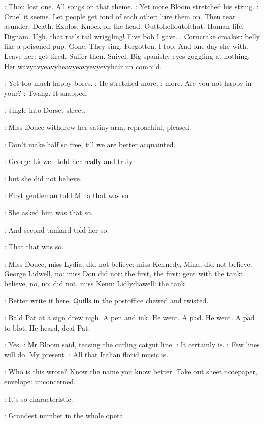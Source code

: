 \BloomInt:
Thou lost one. All songs on that theme.
:
Yet more Bloom stretched his string.
\BloomInt:
Cruel it seems. Let people get fond of each other: lure them on.
Then tear asunder. Death. Explos. Knock on the head. Outtohelloutofthat.
Human life. Dignam. Ugh, that rat's tail wriggling! Five bob I gave.
.
Corncrake croaker: belly like a poisoned pup. Gone.
They sing. Forgotten. I too; And one day she with. Leave her: get tired.
Suffer then. Snivel. Big spanishy eyes goggling at nothing. Her
wavyavyeavyheavyeavyevyevyhair un comb:'d.

\BloomInt:
Yet too much happy bores.
:
He stretched more,
\BloomInt:
more. Are you not happy in your?
:
Twang. It snapped.

:
Jingle into Dorset street.

:
Miss Douce withdrew her satiny arm, reproachful, pleased.

\MissD:
Don't make half so free, till we are better acquainted.

:
George Lidwell told her really and truly:

:
but she did not believe.

:
First gentleman told Mina that was so.

:
She asked him was that so.

:
And second tankard told her so.

:
That that was so.

:
Miss Douce, miss Lydia, did not believe: miss Kennedy, Mina, did not
believe: George Lidwell, no: miss Dou did not: the first, the first: gent
with the tank:
believe, no, no: did not, miss Kenn: Lidlydiawell: the
tank.

\BloomInt:
Better write it here.
Quills in the postoffice chewed and twisted.

:
Bald Pat at a sign drew nigh. A pen and ink. He went. A pad. He
went. A pad to blot. He heard, deaf Pat.

\Bloom:
Yes.
:
Mr Bloom said, teasing the curling catgut line.
\Bloom:
It certainly is.
\BloomInt:
Few lines will do. My present.
\Bloom:
All that Italian florid music is.

\BloomInt:
Who is this wrote? Know the name you know better.
Take out sheet notepaper, envelope: unconcerned.

\Bloom:
It's so characteristic.

\goulding:
Grandest number in the whole opera.

